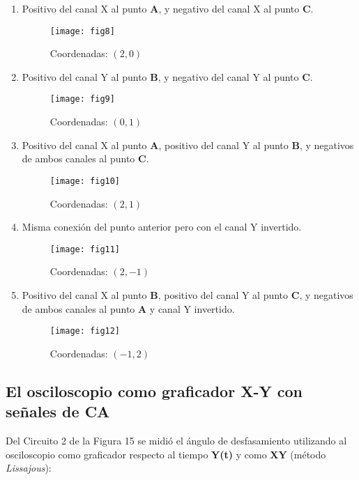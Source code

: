 \documentclass[a4paper,12pt]{article}
\begin{document}
\begin{enumerate}

\item	Positivo del canal X al punto \textbf{A}, y negativo del canal X al punto \textbf{C}.
\begin{figure}[h!]
\centering
	\texttt{[image: fig8]}
	\caption{Coordenadas: $(2,0)$}
\end{figure}

\item	Positivo del canal Y al punto \textbf{B}, y negativo del canal Y al punto \textbf{C}.
\begin{figure}[h!]
\centering
	\texttt{[image: fig9]}
	\caption{Coordenadas: $(0,1)$}
\end{figure}

\item	Positivo del canal X al punto \textbf{A}, positivo del canal Y al punto \textbf{B}, y negativos de ambos canales al punto \textbf{C}.
\begin{figure}[h!]
\centering
	\texttt{[image: fig10]}
	\caption{Coordenadas: $(2,1)$}
\end{figure}

\newpage

\item	Misma conexión del punto anterior pero con el canal Y invertido.
\begin{figure}[h!]
\centering
	\texttt{[image: fig11]}
	\caption{Coordenadas: $(2,-1)$}
\end{figure}

\item	Positivo del canal X al punto \textbf{B}, positivo del canal Y al punto \textbf{C}, y negativos de ambos canales al punto \textbf{A} y canal Y invertido.
\begin{figure}[h!]
\centering
	\texttt{[image: fig12]}
	\caption{Coordenadas: $(-1,2)$}
\end{figure}

\end{enumerate}


\subsection{El osciloscopio como graficador X-Y con señales de CA}

Del Circuito 2 de la Figura 15 se midió el ángulo de desfasamiento utilizando al osciloscopio como graficador respecto al tiempo \textbf{Y(t)} y como \textbf{XY} (método \emph{Lissajous}):
\end{document}
